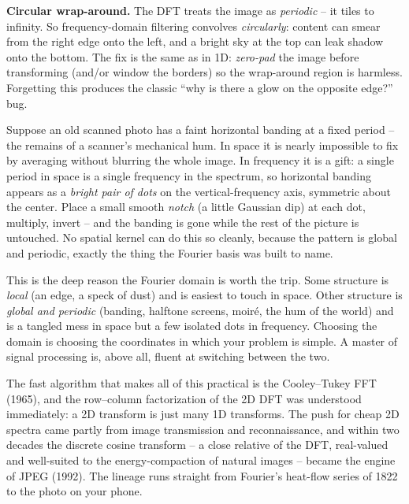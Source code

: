 \begin{trapbox}
\textbf{Circular wrap-around.} The DFT treats the image as \emph{periodic} -- it
tiles to infinity. So frequency-domain filtering convolves \emph{circularly}:
content can smear from the right edge onto the left, and a bright sky at the top can
leak shadow onto the bottom. The fix is the same as in 1D: \emph{zero-pad} the
image before transforming (and/or window the borders) so the wrap-around region is
harmless. Forgetting this produces the classic ``why is there a glow on the
opposite edge?'' bug.
\end{trapbox}

\begin{example}
\label{ch31:ex-notch}
Suppose an old scanned photo has a faint horizontal banding at a fixed period -- the
remains of a scanner's mechanical hum. In space it is nearly impossible to fix by
averaging without blurring the whole image. In frequency it is a gift: a single
period in space is a single frequency in the spectrum, so horizontal banding
appears as a \emph{bright pair of dots} on the vertical-frequency axis, symmetric
about the center. Place a small smooth \emph{notch} (a little Gaussian dip) at each
dot, multiply, invert -- and the banding is gone while the rest of the picture is
untouched. No spatial kernel can do this so cleanly, because the pattern is global
and periodic, exactly the thing the Fourier basis was built to name.
\end{example}

\begin{aestheticbox}
This is the deep reason the Fourier domain is worth the trip. Some structure is
\emph{local} (an edge, a speck of dust) and is easiest to touch in space. Other
structure is \emph{global and periodic} (banding, halftone screens, moir\'e, the
hum of the world) and is a tangled mess in space but a few isolated dots in
frequency. Choosing the domain is choosing the coordinates in which your problem is
simple. A master of signal processing is, above all, fluent at switching between
the two.
\end{aestheticbox}

\begin{historybox}
The fast algorithm that makes all of this practical is the Cooley--Tukey FFT
(1965), and the row--column factorization of the 2D DFT was understood
immediately: a 2D transform is just many 1D transforms. The push for cheap 2D
spectra came partly from image transmission and reconnaissance, and within two
decades the discrete cosine transform -- a close relative of the DFT, real-valued
and well-suited to the energy-compaction of natural images -- became the engine of
JPEG (1992). The lineage runs straight from Fourier's heat-flow series of 1822 to
the photo on your phone.
\end{historybox}

